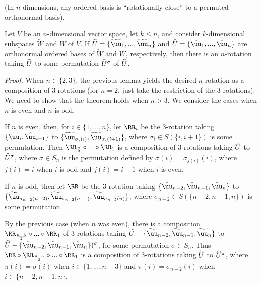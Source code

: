 \begin{theorem}
\label{ch::exterior_pwrs::thm::n_rot_acts_on_orthonormal_basis}
     (In $n$ dimensions, any ordered basis is ``rotationally close'' to a permuted orthonormal basis).
     
     Let $V$ be an $n$-dimensional vector space, let $k \leq n$, and consider $k$-dimensional subspaces $\widetilde{W}$ and $W$ of $V$. If $\tU = \{ \tuu_1, ..., \tuu_n \}$ and $\hU = \{ \huu_1, ..., \huu_n \}$ are orthonormal ordered bases of $\widetilde{W}$ and $W$, respectively, then there is an $n$-rotation taking $\widetilde{U}$ to some permutation $\widehat{U}^\sigma$ of $\widehat{U}$. 
\end{theorem}

\begin{proof}
   When $n \in \{2, 3\}$, the previous lemma yields the desired $n$-rotation as a composition of $3$-rotations (for $n = 2$, just take the restriction of the $3$-rotations). We need to show that the theorem holds when $n > 3$. We consider the cases when $n$ is even and $n$ is odd.
   
   If $n$ is even, then, for $i \in \{1, ..., n\}$, let $\RR_i$ be the $3$-rotation taking $\{ \huu_i,  \huu_{i + 1} \}$ to $\{ \tuu_{\sigma_i(i)},  \tuu_{\sigma_i(i + 1)} \}$, where $\sigma_i \in S(\{i, i + 1\})$ is some permutation. Then $\RR_{\frac{n}{2}} \circ ... \circ \RR_1$ is a composition of $3$-rotations taking $\widetilde{U}$ to $\widehat{U}^\sigma$, where $\sigma \in S_n$ is the permutation defined by $\sigma(i) = \sigma_{j(i)}(i)$, where $j(i) = i$ when $i$ is odd and $j(i) = i - 1$ when $i$ is even.
            
    If $n$ is odd, then let $\RR$ be the $3$-rotation taking $\{ \huu_{n - 2}, \huu_{n - 1}, \huu_n \}$ to \\ $\{ \tuu_{\sigma_{n - 2}(n - 2)}, \tuu_{\sigma_{n - 2}(n - 1)}, \tuu_{\sigma_{n - 2}(n)} \}$, where $\sigma_{n - 2} \in S(\{n - 2, n - 1, n\})$ is some permutation.
            
    By the previous case (when $n$ was even), there is a composition $\RR_{\frac{n - 3}{2}} \circ ... \circ \RR_1$ of $3$-rotations taking $\tU - \{\tuu_{n - 2}, \tuu_{n - 1}, \tuu_n\}$ to $\hU - \{\huu_{n - 2}, \huu_{n - 1}, \huu_n\})^\sigma$, for some permutation $\sigma \in S_n$. Thus $\RR \circ \RR_{\frac{n - 3}{2}} \circ ... \circ \RR_1$ is a composition of $3$-rotations taking $\widetilde{U}$ to $\widehat{U}^\pi$, where $\pi(i) = \sigma(i)$ when $i \in \{1, ..., n - 3\}$ and $\pi(i) = \sigma_{n - 2}(i)$ when $i \in \{n - 2, n - 1, n\}$.
\end{proof}

